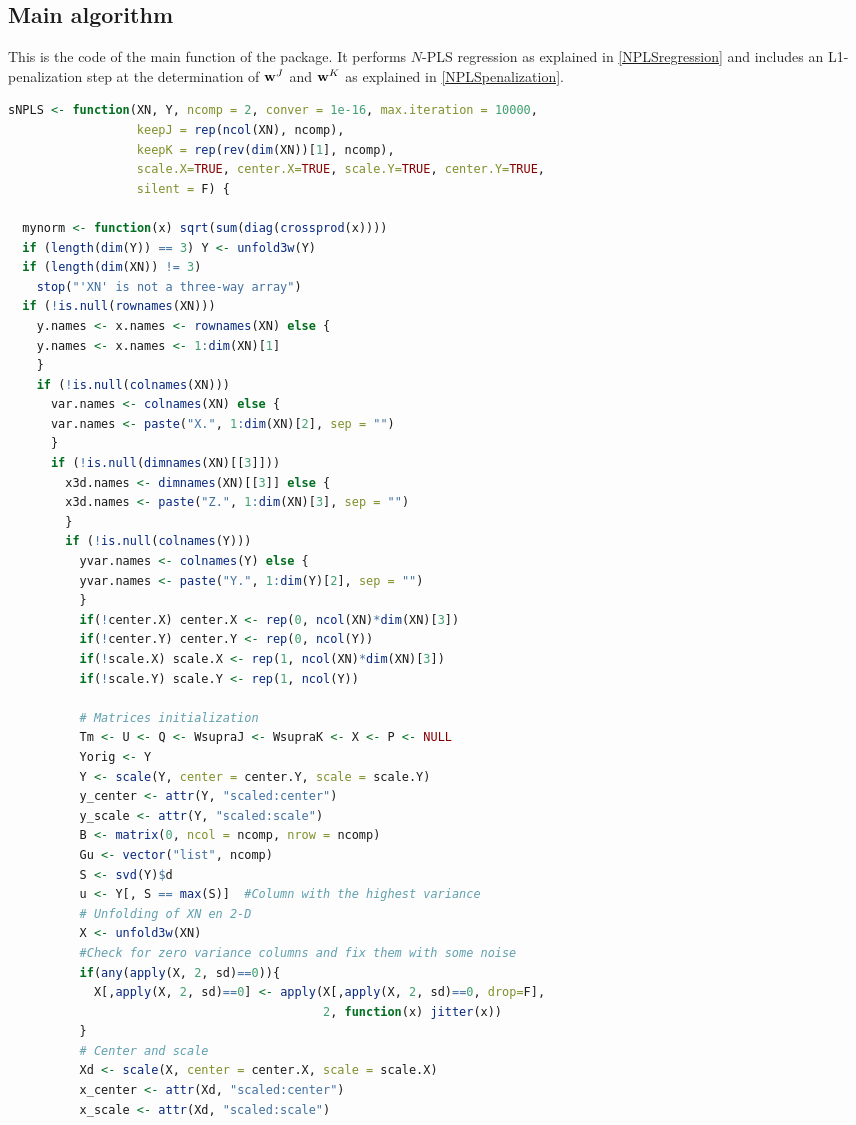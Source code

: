 \subsection{Main algorithm}
This is the code of the main function of the package. It performs $N$-PLS regression as explained in \autoref{NPLSregression} and includes an L1-penalization step at the determination of $\textbf{\text{w}}^{J}$ and $\textbf{\text{w}}^{K}$ as explained in \autoref{NPLSpenalization}.
\vspace{15pt}
\begin{scriptsize}
\begin{lstlisting}[language=R, deletekeywords={scale, !=, <-, !, Q, qf, names, max, var}, otherkeywords={}, morekeywords={unfold3w}, caption=sNPLS main function]
sNPLS <- function(XN, Y, ncomp = 2, conver = 1e-16, max.iteration = 10000,
                  keepJ = rep(ncol(XN), ncomp), 
                  keepK = rep(rev(dim(XN))[1], ncomp),
                  scale.X=TRUE, center.X=TRUE, scale.Y=TRUE, center.Y=TRUE, 
                  silent = F) {
  
  mynorm <- function(x) sqrt(sum(diag(crossprod(x))))
  if (length(dim(Y)) == 3) Y <- unfold3w(Y)
  if (length(dim(XN)) != 3)
    stop("'XN' is not a three-way array")
  if (!is.null(rownames(XN)))
    y.names <- x.names <- rownames(XN) else {
    y.names <- x.names <- 1:dim(XN)[1]
    }
    if (!is.null(colnames(XN)))
      var.names <- colnames(XN) else {
      var.names <- paste("X.", 1:dim(XN)[2], sep = "")
      }
      if (!is.null(dimnames(XN)[[3]]))
        x3d.names <- dimnames(XN)[[3]] else {
        x3d.names <- paste("Z.", 1:dim(XN)[3], sep = "")
        }
        if (!is.null(colnames(Y)))
          yvar.names <- colnames(Y) else {
          yvar.names <- paste("Y.", 1:dim(Y)[2], sep = "")
          }
          if(!center.X) center.X <- rep(0, ncol(XN)*dim(XN)[3])
          if(!center.Y) center.Y <- rep(0, ncol(Y))
          if(!scale.X) scale.X <- rep(1, ncol(XN)*dim(XN)[3])
          if(!scale.Y) scale.Y <- rep(1, ncol(Y))
          
          # Matrices initialization
          Tm <- U <- Q <- WsupraJ <- WsupraK <- X <- P <- NULL
          Yorig <- Y
          Y <- scale(Y, center = center.Y, scale = scale.Y)
          y_center <- attr(Y, "scaled:center")
          y_scale <- attr(Y, "scaled:scale")
          B <- matrix(0, ncol = ncomp, nrow = ncomp)
          Gu <- vector("list", ncomp)
          S <- svd(Y)$d
          u <- Y[, S == max(S)]  #Column with the highest variance
          # Unfolding of XN en 2-D
          X <- unfold3w(XN)
          #Check for zero variance columns and fix them with some noise
          if(any(apply(X, 2, sd)==0)){
            X[,apply(X, 2, sd)==0] <- apply(X[,apply(X, 2, sd)==0, drop=F], 
                                            2, function(x) jitter(x))
          }
          # Center and scale
          Xd <- scale(X, center = center.X, scale = scale.X)
          x_center <- attr(Xd, "scaled:center")
          x_scale <- attr(Xd, "scaled:scale")
          

\end{lstlisting}
\end{scriptsize}
